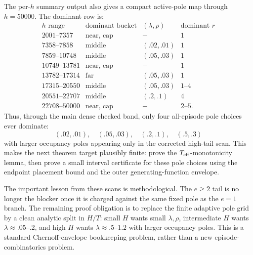 The per-\(h\) summary output also gives a compact active-pole map through \(h=50000\).  The dominant row is:
\[
\begin{array}{c|c|c|c}
h\text{ range} & \text{dominant bucket} & (\lambda,\rho) & \text{dominant }r\\
\hline
2001\text{--}7357 & \text{near, cap} & - & 1\\
7358\text{--}7858 & \text{middle} & (.02,.01) & 1\\
7859\text{--}10748 & \text{middle} & (.05,.03) & 1\\
10749\text{--}13781 & \text{near, cap} & - & 1\\
13782\text{--}17314 & \text{far} & (.05,.03) & 1\\
17315\text{--}20550 & \text{middle} & (.05,.03) & 1\text{--}4\\
20551\text{--}22707 & \text{middle} & (.2,.1) & 4\\
22708\text{--}50000 & \text{near, cap} & - & 2\text{--}5 .
\end{array}
\]
Thus, through the main dense checked band, only four all-episode pole choices ever dominate:
\[
(.02,.01),\quad (.05,.03),\quad (.2,.1),\quad (.5,.3)
\]
with larger occupancy poles appearing only in the corrected high-tail scan.  This makes the next theorem target
plausibly finite: prove the \(T_{\rm eff}\)-monotonicity lemma, then prove a small interval certificate for these pole
choices using the endpoint placement bound and the outer generating-function envelope.

The important lesson from these scans is methodological.  The \(e\ge2\) tail is no longer the blocker once it is
charged against the same fixed pole as the \(e=1\) branch.  The remaining proof obligation is to replace the finite
adaptive pole grid by a clean analytic split in \(H/T\): small \(H\) wants small \(\lambda,\rho\), intermediate \(H\)
wants \(\lambda\approx .05\text{--}.2\), and high \(H\) wants \(\lambda\approx .5\text{--}1.2\) with larger occupancy
poles.  This is a standard Chernoff-envelope bookkeeping problem, rather than a new episode-combinatorics problem.


